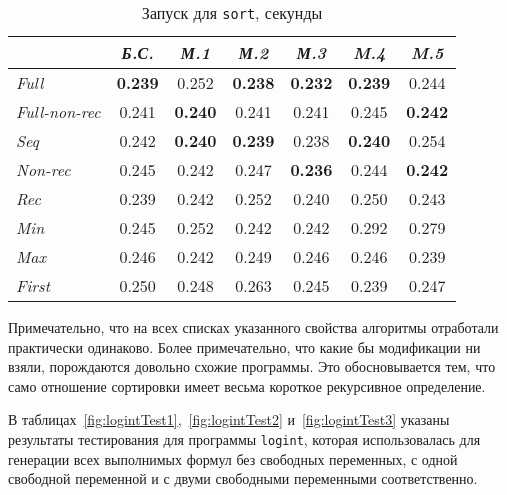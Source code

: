 \begin{table}[h!]

\center
\begin{tabular}{|l|c|c|c|c|c|c|}
\hline
                  &{\it Б.С.}&{\it М.1}&{\it М.2}&{\it М.3}&{\it M.4}&{\it M.5}\\ \hline
{\it Full        } & {\bf 0.239} & 0.252       & {\bf 0.238} & {\bf 0.232} & {\bf 0.239} & 0.244 \\ \hline
{\it Full-non-rec} & 0.241       & {\bf 0.240} & 0.241       & 0.241       & 0.245       & {\bf 0.242} \\ \hline
{\it Seq         } & 0.242       & {\bf 0.240} & {\bf 0.239} & 0.238       & {\bf 0.240} & 0.254 \\ \hline
{\it Non-rec     } & 0.245       &  0.242      & 0.247       & {\bf 0.236} & 0.244       & {\bf 0.242} \\ \hline
{\it Rec         } & 0.239       &  0.242      & 0.252       & 0.240       & 0.250       & 0.243 \\ \hline
{\it Min         } & 0.245       & 0.252       & 0.242       & 0.242       & 0.292       & 0.279 \\ \hline
{\it Max         } & 0.246       & 0.242       & 0.249       & 0.246       & 0.246       & 0.239 \\ \hline
{\it First       } & 0.250       & 0.248       & 0.263       & 0.245       & 0.239       & 0.247 \\ \hline


\end{tabular}
\caption{Запуск для \lstinline{sort}, секунды}
\label{fig:sortTest}
\end{table}

Примечательно, что на всех списках указанного свойства алгоритмы отработали практически
одинаково. Более примечательно, что какие бы модификации ни взяли,
порождаются довольно схожие программы. Это обосновывается тем, что само отношение
сортировки имеет весьма короткое рекурсивное определение.

В таблицах~\ref{fig:logintTest1},~\ref{fig:logintTest2} и~\ref{fig:logintTest3} указаны результаты тестирования для
программы \lstinline{logint}, которая использовалась для генерации всех выполнимых формул
без свободных переменных, с одной свободной переменной и с двуми свободными переменными соответственно.

